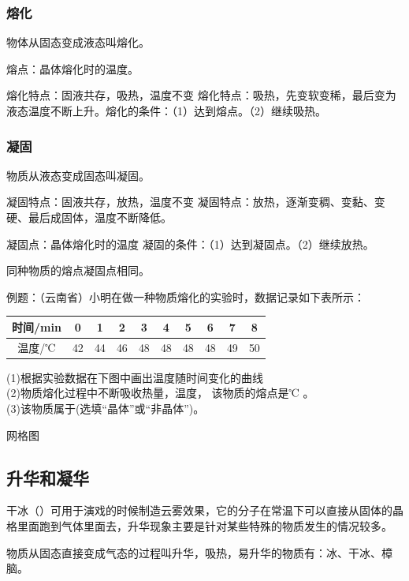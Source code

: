 \documentclass[12pt]{exam}
\begin{document}
\subsubsection{熔化}
物体从固态变成液态叫熔化。

熔点：晶体熔化时的温度。
  
熔化特点：固液共存，吸热，温度不变     熔化特点：吸热，先变软变稀，最后变为液态温度不断上升。熔化的条件：（1）达到熔点。（2）继续吸热。

\subsubsection{凝固}
物质从液态变成固态叫凝固。

凝固特点：固液共存，放热，温度不变     凝固特点：放热，逐渐变稠、变黏、变硬、最后成固体，温度不断降低。

凝固点：晶体熔化时的温度               
凝固的条件：（1）达到凝固点。（2）继续放热。

同种物质的熔点凝固点相同。

例题：（云南省）小明在做一种物质熔化的实验时，数据记录如下表所示：
\begin{table}
\begin{tabular}{|c|c|c|c|c|c|c|c|c|c|}
\hline 
时间/min & 0 & 1 & 2 & 3 & 4 & 5 & 6 & 7 & 8 \\ 
\hline 
温度/℃ & 42 & 44 & 46 & 48 & 48 & 48 & 48 & 49 & 50 \\ 
\hline 
\end{tabular} 
\end{table}

(1)根据实验数据在下图中画出温度随时间变化的曲线\\
(2)物质熔化过程中不断吸收热量，温度\answerline*[不变]， 该物质的熔点是℃ 。\\
(3)该物质属于\answerline*[晶体] (选填“晶体”或“非晶体”)。

\begin{fig}{网格图}
\end{fig}



\subsection{升华和凝华}
干冰（）可用于演戏的时候制造云雾效果，它的分子在常温下可以直接从固体的晶格里面跑到气体里面去，升华现象主要是针对某些特殊的物质发生的情况较多。

物质从固态直接变成气态的过程叫升华，吸热，易升华的物质有：冰、干冰、樟脑。
\end{document}
